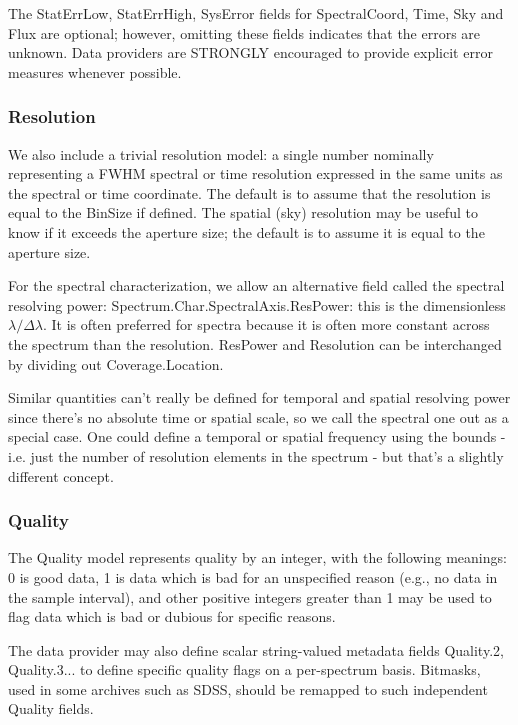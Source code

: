 \documentclass[11pt]{article}
\begin{document}
The StatErrLow, StatErrHigh, SysError fields for
SpectralCoord, Time, Sky and Flux are optional; however, omitting these fields
indicates that the errors are unknown. Data providers are STRONGLY
encouraged to provide explicit error measures whenever possible. 

 

\subsubsection{Resolution}

We also include a trivial resolution model: a single number
nominally representing a FWHM spectral or time resolution expressed in the
same units as the spectral or time coordinate. The default is to assume
that the resolution is equal to the BinSize if defined.
The spatial (sky) resolution may be useful to know if it exceeds the
aperture size; the default is to assume it is equal to the aperture size.

For the spectral characterization, we allow an alternative 
field called the spectral resolving power: Spectrum.Char.SpectralAxis.ResPower:
this is the dimensionless $\lambda/\Delta\lambda$. It is often preferred
for spectra because it is often more constant across the spectrum
than the resolution. 
ResPower and Resolution can be interchanged by dividing out 
Coverage.Location.


Similar quantities can't really be defined for
temporal and spatial resolving power since there's no absolute
time or spatial scale, so we call the spectral one out as a special case.
One could define a temporal or
spatial frequency using the bounds - i.e. just the number
of resolution elements in the spectrum - but that's a slightly
different concept.


\subsubsection{Quality}
  
The Quality model represents quality by an integer, with the following
meanings: 0 is good data, 1 is data which is bad for an unspecified
reason (e.g., no data in the sample interval), and other positive
integers greater than 1 may be used to flag data which is bad or dubious
for specific reasons. 

The data provider may also define scalar string-valued
metadata fields Quality.2, Quality.3...  to define specific quality flags
on a per-spectrum basis. Bitmasks, used in some archives such as SDSS,
should be remapped to such independent Quality fields.
\end{document}

